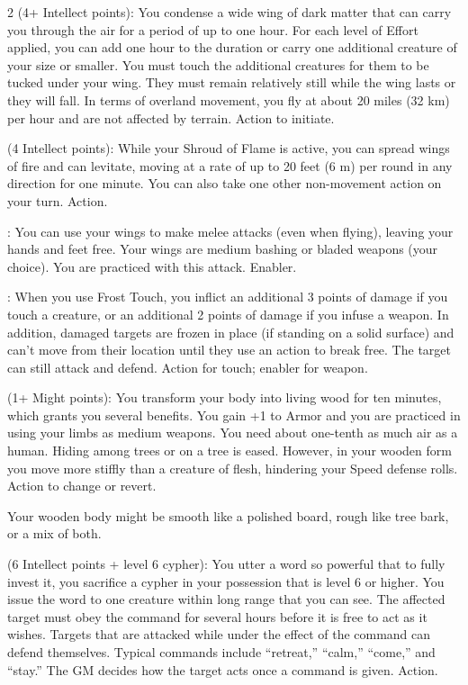 \begin{multicols}{2}
 (4+ Intellect points): You condense a wide wing of dark matter that can carry you through the air for a period of up to one hour. For each level of Effort applied, you can add one hour to the duration or carry one additional creature of your size or smaller. You must touch the additional creatures for them to be tucked under your wing. They must remain relatively still while the wing lasts or they will fall. In terms of overland movement, you fly at about 20 miles (32 km) per hour and are not affected by terrain. Action to initiate. 
 
 (4 Intellect points): While your Shroud of Flame is active, you can spread wings of fire and can levitate, moving at a rate of up to 20 feet (6 m) per round in any direction for one minute. You can also take one other
non-movement action on your turn. Action. 
 
: You can use your wings to make melee attacks (even when flying), leaving your hands and feet free. Your wings are medium bashing or bladed weapons (your choice). You are practiced with this attack. Enabler.

: When you use Frost Touch, you inflict an additional 3 points of damage if you touch a creature, or an additional 2 points of damage if you infuse a weapon. In addition, damaged targets are frozen in place (if standing on a solid surface) and can’t move from their location until they use an action to break free. The target can still attack and defend. Action for touch; enabler for weapon. 
 
 (1+ Might points): You transform your body into living wood for ten minutes, which grants you several benefits. You gain +1 to Armor and you are practiced in using your limbs as medium weapons. You need about one-tenth as much air as a human. Hiding among trees or on a tree is eased. However, in your wooden form you move more stiffly than a creature of flesh, hindering your Speed defense rolls. Action to change or revert.

Your wooden body might be smooth like a polished board, rough like tree bark, or a mix of both.

 (6 Intellect points + level 6 cypher): You utter a word so powerful that to fully invest it, you sacrifice a cypher in your possession that is level 6 or higher. You issue the word to one creature within long range that you can see. The affected target must obey the command for several hours before it is free to act as it wishes. Targets that are attacked while under the effect of the command can defend themselves. Typical commands include “retreat,” “calm,” “come,” and “stay.” The GM decides how the target acts once a command is given. Action. 
 

\end{multicols}
